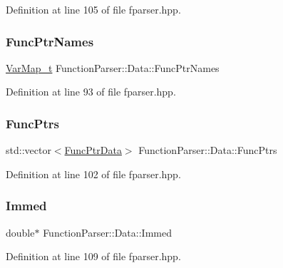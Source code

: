 Definition at line 105 of file fparser.\+hpp.

\mbox{\label{struct_function_parser_1_1_data_aca8bc3c4c9840a4ce7fc75a6fb6d0e61}} 
\subsubsection{\texorpdfstring{Func\+Ptr\+Names}{FuncPtrNames}}
{\footnotesize\ttfamily \hyperlink{struct_function_parser_1_1_data_a02f3fbca3164d0e498312b418258ea84}{Var\+Map\+\_\+t} Function\+Parser\+::\+Data\+::\+Func\+Ptr\+Names}



Definition at line 93 of file fparser.\+hpp.

\mbox{\label{struct_function_parser_1_1_data_a1ba8025daa062d7eef15b95a49c4607f}} 
\subsubsection{\texorpdfstring{Func\+Ptrs}{FuncPtrs}}
{\footnotesize\ttfamily std\+::vector$<$\hyperlink{struct_function_parser_1_1_data_1_1_func_ptr_data}{Func\+Ptr\+Data}$>$ Function\+Parser\+::\+Data\+::\+Func\+Ptrs}



Definition at line 102 of file fparser.\+hpp.

\mbox{\label{struct_function_parser_1_1_data_a5a1b2b3c4adaed1b098413547cc67ce3}} 
\subsubsection{\texorpdfstring{Immed}{Immed}}
{\footnotesize\ttfamily double$\ast$ Function\+Parser\+::\+Data\+::\+Immed}



Definition at line 109 of file fparser.\+hpp.

